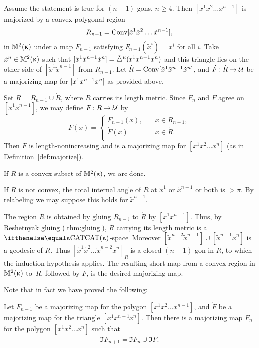 Assume the statement is true for $(n-1)$-gons, $n\ge 4$.  
Then  $[x^1 x^2 \dots x^{n-1}]$  is majorized by a convex polygonal region 
\[R_{n-1}=\Conv[\tilde x^1 \tilde x^2\dots \tilde x^{n-1}],\] 
in $\mathbb{M}_{{}}^{2}({\upkappa})$ under a map $F_{n-1}$ satisfying $F_{n-1}(\tilde x^i)=x^i$ for all $i$. 
Take $\dot x^n\in\Lob2{\kappa}$ such that $[{\tilde x^1}{\tilde x^{n-1}}{\dot x^n}]={\tilde\triangle}^{\upkappa}(x^1 x^{n-1} x^n)$ 
and this triangle lies on the other side of $[\tilde x^1\tilde x^{n-1}]$ from $R_{n-1}$.  
Let $\dot R\z=\Conv\trig{\tilde x^1}{\tilde x^{n-1}}{\dot x^n}$, 
and $\dot F\:\dot R\to \spc{U}$ be a majorizing map for $[{ x^1}{x^{n-1}}{ x^n}]$ as provided above.

Set 
$R= R_{n-1}\cup \dot R$, where $R$ carries its length metric.
Since $F_n$ and $F$ agree on $[\tilde x^1 \tilde x^{n-1}]$, we may define $F\:R\to\spc{U}$ by 
\[
F(x)=
\begin{cases}
F_{n-1}(x),\quad & x\in R_{n-1},\\
\dot F(x),\quad & x\in \dot R.\\
\end{cases}
\]
Then $F$ is length-nonincreasing and is a majorizing map for $[x^1 x^2 \dots x^n ]$ (as in Definition~\ref{def:majorize}).

If $R$ is a convex subset of $\mathbb{M}_{{}}^{2}({\upkappa})$, we are done. 

If $R$ is not convex,  the total internal angle of $R$ at $\tilde x^1$ or $ \tilde x^{n-1} $ or both is $>\pi$.  
By relabeling we may suppose this holds for $\tilde x^{n-1}$.  

The region $R$ is obtained by gluing $R_{n-1}$ to $\dot R$ by $[x^1x^{n-1}]$.
Thus, by Reshetnyak gluing (\ref{thm:gluing}), $R$ carrying its length metric is a $\CAT{\kappa}$-space.  
Moreover $[\tilde x^{n-2}\tilde x^{n-1}]\cup[\tilde x^{n-1} \dot x^n]$ is a geodesic of $R$.
Thus $[\tilde x^1 \tilde x^2 \dots \tilde x^{n-2} \dot x^n]_R$ is a closed $(n-1)$-gon in $R$, to which the induction hypothesis applies. The resulting short map from a convex region in $ \mathbb{M}_{{}}^{2}({\upkappa})$ to~$R$, followed by $F$,  is the desired majorizing map.

\medskip

Note that in fact we have proved the following:

\begin{clm}{}
Let $F_{n-1}$ be a majorizing map for the polygon $[x^1x^2\dots x^{n-1}]$,
and $\dot F$ be a majorizing map for the triangle $[x^1x^{n-1}x^{n}]$.
Then there is a majorizing map $F_n$ for the polygon $[x^1x^2\dots x^n]$
such that \[\Im F_{n+1}= \Im F_n\cup\Im \dot F.\]

\end{clm}

